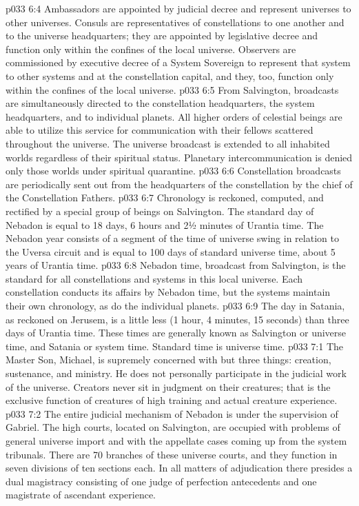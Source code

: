 \vs p033 6:4 \pc Ambassadors are appointed by judicial decree and represent universes to other universes. Consuls are representatives of constellations to one another and to the universe headquarters; they are appointed by legislative decree and function only within the confines of the local universe. Observers are commissioned by executive decree of a System Sovereign to represent that system to other systems and at the constellation capital, and they, too, function only within the confines of the local universe.
\vs p033 6:5 \pc From Salvington, broadcasts are simultaneously directed to the constellation headquarters, the system headquarters, and to individual planets. All higher orders of celestial beings are able to utilize this service for communication with their fellows scattered throughout the universe. The universe broadcast is extended to all inhabited worlds regardless of their spiritual status. Planetary intercommunication is denied only those worlds under spiritual quarantine.
\vs p033 6:6 Constellation broadcasts are periodically sent out from the headquarters of the constellation by the chief of the Constellation Fathers.
\vs p033 6:7 \pc Chronology is reckoned, computed, and rectified by a special group of beings on Salvington. The standard day of Nebadon is equal to 18 days, 6 hours and 2½ minutes of Urantia time. The Nebadon year consists of a segment of the time of universe swing in relation to the Uversa circuit and is equal to 100 days of standard universe time, about 5 years of Urantia time.
\vs p033 6:8 Nebadon time, broadcast from Salvington, is the standard for all constellations and systems in this local universe. Each constellation conducts its affairs by Nebadon time, but the systems maintain their own chronology, as do the individual planets.
\vs p033 6:9 The day in Satania, as reckoned on Jerusem, is a little less (1 hour, 4 minutes, 15 seconds) than three days of Urantia time. These times are generally known as Salvington or universe time, and Satania or system time. Standard time is universe time.
\vs p033 7:1 The Master Son, Michael, is supremely concerned with but three things: creation, sustenance, and ministry. He does not personally participate in the judicial work of the universe. Creators never sit in judgment on their creatures; that is the exclusive function of creatures of high training and actual creature experience.
\vs p033 7:2 The entire judicial mechanism of Nebadon is under the supervision of Gabriel. The high courts, located on Salvington, are occupied with problems of general universe import and with the appellate cases coming up from the system tribunals. There are 70 branches of these universe courts, and they function in seven divisions of ten sections each. In all matters of adjudication there presides a dual magistracy consisting of one judge of perfection antecedents and one magistrate of ascendant experience.
